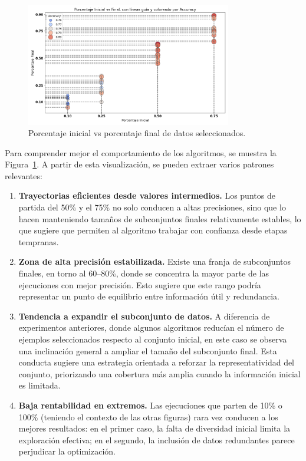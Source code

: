 \begin{figure}[htp]
  \centering
  \includegraphics[width=0.8\textwidth]{imagenes/evaluaciones/cifar10/scatter.png}
  \caption{Porcentaje inicial vs porcentaje final de datos seleccionados.}
  \label{fig:cifar10_scatter}
\end{figure}

Para comprender mejor el comportamiento de los algoritmos, se muestra la Figura~\ref{fig:cifar10_scatter}.
A partir de esta visualización, se pueden extraer varios patrones relevantes:

\begin{enumerate}
  \item \textbf{Trayectorias eficientes desde valores intermedios.} Los puntos de partida del 50\% y el 75\% no solo conducen a altas precisiones,
        sino que lo hacen manteniendo tamaños de subconjuntos finales relativamente estables, lo que sugiere que permiten al algoritmo trabajar con confianza desde etapas tempranas.
  \item \textbf{Zona de alta precisión estabilizada.} Existe una franja de subconjuntos finales, en torno al 60--80\%,
        donde se concentra la mayor parte de las ejecuciones con mejor precisión.
        Esto sugiere que este rango podría representar un punto de equilibrio entre información útil y redundancia.
  \item \textbf{Tendencia a expandir el subconjunto de datos.} A diferencia de experimentos anteriores,
        donde algunos algoritmos reducían el número de ejemplos seleccionados respecto al conjunto inicial,
        en este caso se observa una inclinación general a ampliar el tamaño del subconjunto final.
        Esta conducta sugiere una estrategia orientada a reforzar la representatividad del conjunto,
        priorizando una cobertura más amplia cuando la información inicial es limitada.
  \item \textbf{Baja rentabilidad en extremos.} Las ejecuciones que parten de 10\% o 100\% (teniendo el contexto de las otras figuras)
        rara vez conducen a los mejores resultados: en el primer caso, la falta de diversidad inicial limita la exploración efectiva; en el segundo,
        la inclusión de datos redundantes parece perjudicar la optimización.
\end{enumerate}

